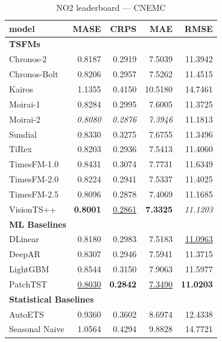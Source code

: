 \begin{table}[H]
\caption{NO2 leaderboard --- CNEMC}
\centering
\begin{small}
\begin{tabular}{lrrrr}
\toprule
model & MASE & CRPS & MAE & RMSE \\
\midrule
\multicolumn{5}{l}{\textbf{TSFMs}} \\
Chronos-2 & 0.8187 & 0.2919 & 7.5039 & 11.3942 \\
Chronos-Bolt & 0.8206 & 0.2957 & 7.5262 & 11.4515 \\
Kairos & 1.1355 & 0.4150 & 10.5180 & 14.7461 \\
Moirai-1 & 0.8284 & 0.2995 & 7.6005 & 11.3725 \\
Moirai-2 & \textit{0.8080} & \textit{0.2876} & \textit{7.3946} & 11.1813 \\
Sundial & 0.8330 & 0.3275 & 7.6755 & 11.3496 \\
TiRex & 0.8203 & 0.2936 & 7.5413 & 11.4060 \\
TimesFM-1.0 & 0.8431 & 0.3074 & 7.7731 & 11.6349 \\
TimesFM-2.0 & 0.8224 & 0.2941 & 7.5337 & 11.4025 \\
TimesFM-2.5 & 0.8096 & 0.2878 & 7.4069 & 11.1685 \\
VisionTS++ & \textbf{0.8001} & \underline{0.2861} & \textbf{7.3325} & \textit{11.1203} \\
\midrule
\multicolumn{5}{l}{\textbf{ML Baselines}} \\
DLinear & 0.8180 & 0.2983 & 7.5183 & \underline{11.0963} \\
DeepAR & 0.8307 & 0.2946 & 7.5941 & 11.3715 \\
LightGBM & 0.8544 & 0.3150 & 7.9063 & 11.5977 \\
PatchTST & \underline{0.8030} & \textbf{0.2842} & \underline{7.3490} & \textbf{11.0203} \\
\midrule
\multicolumn{5}{l}{\textbf{Statistical Baselines}} \\
AutoETS & 0.9360 & 0.3602 & 8.6974 & 12.4338 \\
Seasonal Naive & 1.0564 & 0.4294 & 9.8828 & 14.7721 \\
\bottomrule
\end{tabular}
\end{small}
\end{table}